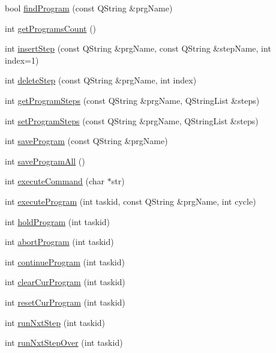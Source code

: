 \begin{DoxyCompactItemize}
\item 
bool \hyperlink{classCUIApp_a9fdc1f0419dbfb6fb9b5c699443aaa6f}{find\-Program} (const Q\-String \&prg\-Name)
\item 
int \hyperlink{classCUIApp_ac6aae50ce175ebb747b3cf6a09eac470}{get\-Programs\-Count} ()
\item 
int \hyperlink{classCUIApp_abb18a18a93e84838a34d99e10aa0b036}{insert\-Step} (const Q\-String \&prg\-Name, const Q\-String \&step\-Name, int index=1)
\item 
int \hyperlink{classCUIApp_a228f715f0ab12f6903fe78d4ce5fac8d}{delete\-Step} (const Q\-String \&prg\-Name, int index)
\item 
int \hyperlink{classCUIApp_a8829edc5cbe151eb81e310080f95e6b9}{get\-Program\-Steps} (const Q\-String \&prg\-Name, Q\-String\-List \&steps)
\item 
int \hyperlink{classCUIApp_a7cada6fdcbaf4f3390726ba03bb5f164}{set\-Program\-Steps} (const Q\-String \&prg\-Name, Q\-String\-List \&steps)
\item 
int \hyperlink{classCUIApp_a037de6d8be99831562b1c157eef1cfae}{save\-Program} (const Q\-String \&prg\-Name)
\item 
int \hyperlink{classCUIApp_a762c36f582d0f2d80280129a5cfa8845}{save\-Program\-All} ()
\item 
int \hyperlink{classCUIApp_a82d14569d3fb78a02379cd061233754c}{execute\-Command} (char $\ast$str)
\item 
int \hyperlink{classCUIApp_a3725056976dca5ff4421b818e19aba41}{execute\-Program} (int taskid, const Q\-String \&prg\-Name, int cycle)
\item 
int \hyperlink{classCUIApp_a800f6928aa302c9898282b33d6f67063}{hold\-Program} (int taskid)
\item 
int \hyperlink{classCUIApp_acbf70cc0ff1d7a7d470424065984c37d}{abort\-Program} (int taskid)
\item 
int \hyperlink{classCUIApp_ac9e8075a0d1645830b451870368be7d7}{continue\-Program} (int taskid)
\item 
int \hyperlink{classCUIApp_a1418345bd5ea072ad265e1832da5be1c}{clear\-Cur\-Program} (int taskid)
\item 
int \hyperlink{classCUIApp_aab24a02fe45512a2d04a03cf308f4846}{reset\-Cur\-Program} (int taskid)
\item 
int \hyperlink{classCUIApp_a1cb0b7f420d5c736eabe5aeade669684}{run\-Nxt\-Step} (int taskid)
\item 
int \hyperlink{classCUIApp_a259d5dab2d54a11caf34c15cf8b7d7cc}{run\-Nxt\-Step\-Over} (int taskid)

\end{DoxyCompactItemize}
